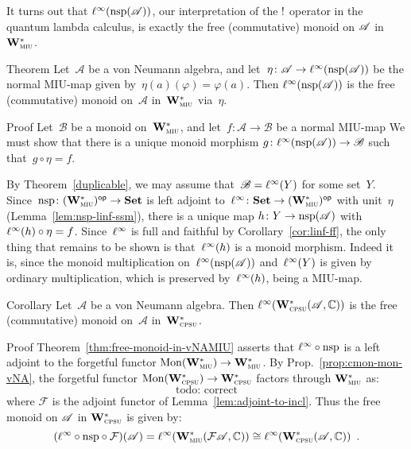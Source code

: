 \documentclass[a]{subfiles}
\begin{document}
\begin{parsec}
It turns out that $\ell^\infty(\mathrm{nsp}(\mathscr{A}))$,
our interpretation of the $\mathord{!}$ operator in the quantum lambda calculus,
is exactly the free (commutative) monoid on $\mathscr{A}$ in $\mathbf{W}^*_{\text{\textsc{miu}}}$.

\begin{point}{Theorem}
\label{thm:free-monoid-in-vNAMIU}
Let~$\mathscr{A}$
be a von Neumann algebra,
and let~$\eta\colon \mathscr{A}\to\ell^\infty(\mathrm{nsp}(\mathscr{A}))$
be the normal MIU-map
given by~$\eta(a)(\varphi)= \varphi(a)$.
Then $\ell^\infty(\mathrm{nsp}(\mathscr{A}))$
is the free (commutative) monoid
on~$\mathscr{A}$
in~$\mathbf{W}^*_{\text{\textsc{miu}}}$ via~$\eta$.
\end{point}
\begin{point}{Proof}
Let~$\mathscr{B}$
be a monoid 
on~$\mathbf{W}^*_{\text{\textsc{miu}}}$,
and let~$f\colon \mathscr{A}\to\mathscr{B}$
be a normal MIU-map
We must show that
there is a unique
monoid morphism
$g\colon \ell^\infty(\mathrm{nsp}(\mathscr{A}))
\rightarrow \mathscr{B}$
such that~$g\circ \eta = f$.

By Theorem~\ref{duplicable},
we may assume that~$\mathscr{B}=\ell^\infty(Y)$
for some set~$Y$.
Since~$\mathrm{nsp}\colon {(\mathbf{W}^*_{\text{\textsc{miu}}})}{^{\mathsf{op}}}\to \mathbf{Set}$
is left adjoint
to~$\ell^\infty\colon \mathbf{Set} \to {(\mathbf{W}^*_{\text{\textsc{miu}}})}{^{\mathsf{op}}}$
with unit~$\eta$ (Lemma~\ref{lem:nsp-linf-ssm}),
there is a unique map $h\colon Y\to \mathrm{nsp}(\mathscr{A})$
with $\ell^\infty(h)\circ \eta = f$.
Since~$\ell^\infty$ is full and faithful
by Corollary~\ref{cor:linf-ff},
the only thing that remains to be shown is that~$\ell^\infty(h)$
is a monoid morphism.
Indeed it is,
since the monoid multiplication
on~$\ell^\infty(\mathrm{nsp}(\mathscr{A}))$
and~$\ell^\infty(Y)$
is given by ordinary multiplication,
which is preserved by~$\ell^\infty(h)$,
being a MIU-map.
\end{point}

\begin{point}{Corollary}
Let~$\mathscr{A}$
be a von Neumann algebra.
Then $\ell^\infty(\mathbf{W}^*_{\text{\textsc{cpsu}}}(\mathscr{A},\mathbb{C}))$
is the free (commutative) monoid
on~$\mathscr{A}$ in~$\mathbf{W}^*_{\text{\textsc{cpsu}}}$.
\end{point}
\begin{point}{Proof}
Theorem~\ref{thm:free-monoid-in-vNAMIU} asserts that
$\ell^\infty\circ\mathrm{nsp}$ is a left adjoint to
the forgetful functor $\mathrm{Mon}(\mathbf{W}^*_{\text{\textsc{miu}}})\to\mathbf{W}^*_{\text{\textsc{miu}}}$.
By Prop.~\ref{prop:cmon-mon-vNA},
the forgetful functor $\mathrm{Mon}(\mathbf{W}^*_{\text{\textsc{cpsu}}})\to\mathbf{W}^*_{\text{\textsc{cpsu}}}$
factors through $\mathbf{W}^*_{\text{\textsc{miu}}}$ as:
\[
	\text{todo: correct}
\]
where $\mathcal{F}$ is the adjoint functor of Lemma~\ref{lem:adjoint-to-incl}.
Thus the free monoid on $\mathscr{A}$ in $\mathbf{W}^*_{\text{\textsc{cpsu}}}$ is given by:
\[
(\ell^\infty\circ\mathrm{nsp}\circ\mathcal{F})(\mathscr{A})
=
\ell^\infty(\mathbf{W}^*_{\text{\textsc{miu}}}(\mathcal{F}\mathscr{A},\mathbb{C}))
\cong
\ell^\infty(\mathbf{W}^*_{\text{\textsc{cpsu}}}(\mathscr{A},\mathbb{C}))
\enspace.
\]
\end{point}


\end{parsec}
\end{document}
